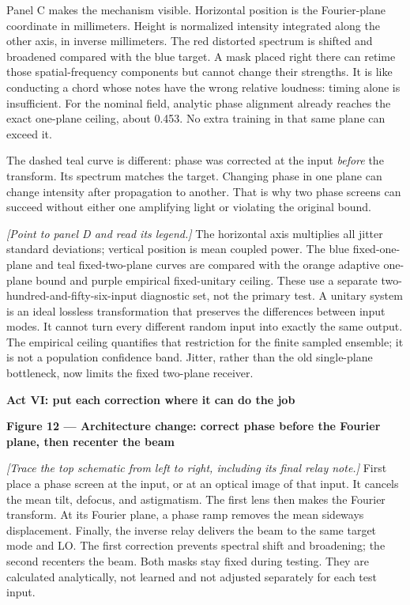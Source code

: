 \documentclass[11pt,letterpaper]{article}
\newcommand{\cue}[1]{\par\textbf{#1}\par}
\newcommand{\stage}[1]{\textit{[#1]}}
\begin{document}
Panel C makes the mechanism visible. Horizontal position is the Fourier-plane coordinate in millimeters. Height is normalized intensity integrated along the other axis, in inverse millimeters. The red distorted spectrum is shifted and broadened compared with the blue target. A mask placed right there can retime those spatial-frequency components but cannot change their strengths. It is like conducting a chord whose notes have the wrong relative loudness: timing alone is insufficient. For the nominal field, analytic phase alignment already reaches the exact one-plane ceiling, about 0.453. No extra training in that same plane can exceed it.

The dashed teal curve is different: phase was corrected at the input \emph{before} the transform. Its spectrum matches the target. Changing phase in one plane can change intensity after propagation to another. That is why two phase screens can succeed without either one amplifying light or violating the original bound.

\stage{Point to panel D and read its legend.}
The horizontal axis multiplies all jitter standard deviations; vertical position is mean coupled power. The blue fixed-one-plane and teal fixed-two-plane curves are compared with the orange adaptive one-plane bound and purple empirical fixed-unitary ceiling. These use a separate two-hundred-and-fifty-six-input diagnostic set, not the primary test. A unitary system is an ideal lossless transformation that preserves the differences between input modes. It cannot turn every different random input into exactly the same output. The empirical ceiling quantifies that restriction for the finite sampled ensemble; it is not a population confidence band. Jitter, rather than the old single-plane bottleneck, now limits the fixed two-plane receiver.

\newpage
\cue{Act VI: put each correction where it can do the job}
\cue{Figure 12 --- Architecture change: correct phase before the Fourier plane, then recenter the beam}
\stage{Trace the top schematic from left to right, including its final relay note.}
First place a phase screen at the input, or at an optical image of that input. It cancels the mean tilt, defocus, and astigmatism. The first lens then makes the Fourier transform. At its Fourier plane, a phase ramp removes the mean sideways displacement. Finally, the inverse relay delivers the beam to the same target mode and LO. The first correction prevents spectral shift and broadening; the second recenters the beam. Both masks stay fixed during testing. They are calculated analytically, not learned and not adjusted separately for each test input.
\end{document}
